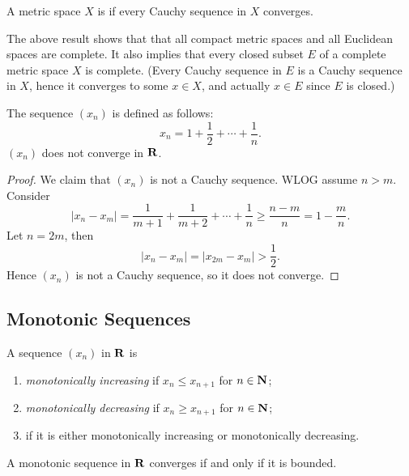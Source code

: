 \begin{definition}
A metric space $X$ is  if every Cauchy sequence in $X$ converges.
\end{definition}

\begin{remark}
The above result shows that that all compact metric spaces and all Euclidean spaces are complete. It also implies that every closed subset $E$ of a complete metric space $X$ is complete. (Every Cauchy sequence in $E$ is a Cauchy sequence in $X$, hence it converges to some $x\in X$, and actually $x\in E$ since $E$ is closed.)
\end{remark}

\begin{example}
The sequence $(x_n)$ is defined as follows:
\[x_n=1+\frac{1}{2}+\cdots+\frac{1}{n}.\]
$(x_n)$ does not converge in $\mathbf R$.
\begin{proof}
We claim that $(x_n)$ is not a Cauchy sequence. WLOG assume $n>m$. Consider
\[|x_n-x_m|=\frac{1}{m+1}+\frac{1}{m+2}+\cdots+\frac{1}{n}\ge\frac{n-m}{n}=1-\frac{m}{n}.\]
Let $n=2m$, then
\[|x_n-x_m|=|x_{2m}-x_m|>\frac{1}{2}.\]
Hence $(x_n)$ is not a Cauchy sequence, so it does not converge.
\end{proof}
\end{example}

\subsection{Monotonic Sequences}
\begin{definition}
A sequence $(x_n)$ in $\mathbf R$ is
\begin{enumerate}[label=(\roman*)]
\item \emph{monotonically increasing} if $x_n\le x_{n+1}$ for $n\in\mathbf N$;
\item \emph{monotonically decreasing} if $x_n\ge x_{n+1}$ for $n\in\mathbf N$;
\item {} if it is either monotonically increasing or monotonically decreasing.
\end{enumerate}
\end{definition}

\begin{lemma}
A monotonic sequence in $\mathbf R$ converges if and only if it is bounded.
\end{lemma}

